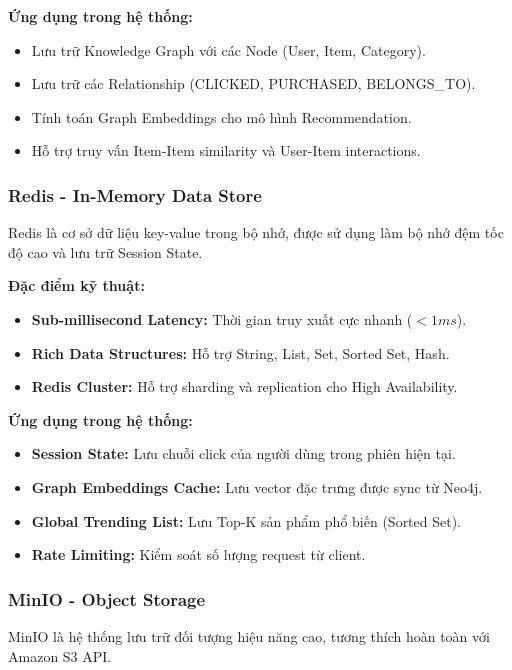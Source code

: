 \textbf{Ứng dụng trong hệ thống:}
\begin{itemize}
    \item Lưu trữ Knowledge Graph với các Node (User, Item, Category).
    \item Lưu trữ các Relationship (CLICKED, PURCHASED, BELONGS\_TO).
    \item Tính toán Graph Embeddings cho mô hình Recommendation.
    \item Hỗ trợ truy vấn Item-Item similarity và User-Item interactions.
\end{itemize}

\subsubsection{Redis - In-Memory Data Store}

Redis là cơ sở dữ liệu key-value trong bộ nhớ, được sử dụng làm bộ nhớ đệm tốc độ cao và lưu trữ Session State.

\textbf{Đặc điểm kỹ thuật:}
\begin{itemize}
    \item \textbf{Sub-millisecond Latency:} Thời gian truy xuất cực nhanh ($<1ms$).
    \item \textbf{Rich Data Structures:} Hỗ trợ String, List, Set, Sorted Set, Hash.
    \item \textbf{Redis Cluster:} Hỗ trợ sharding và replication cho High Availability.
\end{itemize}

\textbf{Ứng dụng trong hệ thống:}
\begin{itemize}
    \item \textbf{Session State:} Lưu chuỗi click của người dùng trong phiên hiện tại.
    \item \textbf{Graph Embeddings Cache:} Lưu vector đặc trưng được sync từ Neo4j.
    \item \textbf{Global Trending List:} Lưu Top-K sản phẩm phổ biến (Sorted Set).
    \item \textbf{Rate Limiting:} Kiểm soát số lượng request từ client.
\end{itemize}

\subsubsection{MinIO - Object Storage}

MinIO là hệ thống lưu trữ đối tượng hiệu năng cao, tương thích hoàn toàn với Amazon S3 API.

